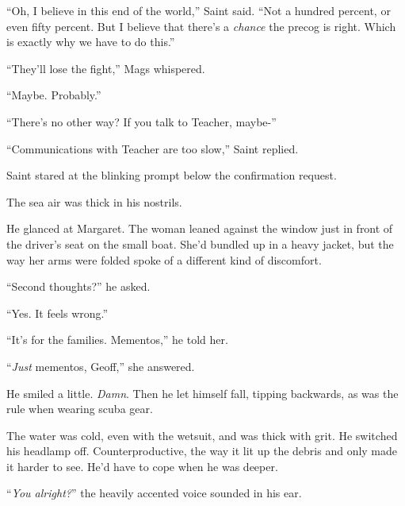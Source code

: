 ``Oh, I believe in this end of the world,'' Saint said.  ``Not a hundred percent, or even fifty percent.  But I believe that there's a \emph{chance} the precog is right.  Which is exactly why we have to do this.''



``They'll lose the fight,'' Mags whispered.



``Maybe.  Probably.''



``There's no other way?  If you talk to Teacher, maybe-''



``Communications with Teacher are too slow,'' Saint replied.



Saint stared at the blinking prompt below the confirmation request.



\blacksquare



The sea air was thick in his nostrils.



He glanced at Margaret.  The woman leaned against the window just in front of the driver's seat on the small boat.  She'd bundled up in a heavy jacket, but the way her arms were folded spoke of a different kind of discomfort.



``Second thoughts?'' he asked.



``Yes.  It feels wrong.''



``It's for the families.  Mementos,'' he told her.



``\emph{Just} mementos, Geoff,'' she answered.



He smiled a little.  \emph{Damn}.  Then he let himself fall, tipping backwards, as was the rule when wearing scuba gear.



The water was cold, even with the wetsuit, and was thick with grit.  He switched his headlamp off.  Counterproductive, the way it lit up the debris and only made it harder to see.  He'd have to cope when he was deeper.



``\emph{You alright?}'' the heavily accented voice sounded in his ear.



